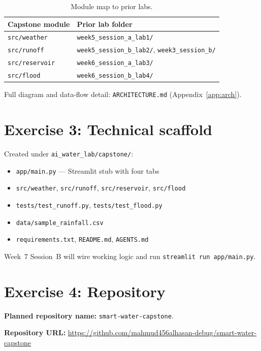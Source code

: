\documentclass[11pt,a4paper]{article}
\newcommand{\capstonerepo}{https://github.com/mahmud456alhasan-debug/smart-water-capstone}
\begin{document}
\begin{table}[htbp]
  \centering
  \caption{Module map to prior labs.}
  \label{tab:reuse}
  \small
  \begin{tabular}{@{}ll@{}}
    \toprule
    Capstone module & Prior lab folder \\
    \midrule
    \texttt{src/weather} & \texttt{week5\_session\_a\_lab1/} \\
    \texttt{src/runoff} & \texttt{week5\_session\_b\_lab2/}, \texttt{week3\_session\_b/} \\
    \texttt{src/reservoir} & \texttt{week6\_session\_a\_lab3/} \\
    \texttt{src/flood} & \texttt{week6\_session\_b\_lab4/} \\
    \bottomrule
  \end{tabular}
\end{table}

Full diagram and data-flow detail: \texttt{ARCHITECTURE.md} (Appendix~\ref{app:arch}).

\section{Exercise 3: Technical scaffold}

Created under \texttt{ai\_water\_lab/capstone/}:
\begin{itemize}[noitemsep]
  \item \texttt{app/main.py} --- Streamlit stub with four tabs
  \item \texttt{src/weather}, \texttt{src/runoff}, \texttt{src/reservoir}, \texttt{src/flood}
  \item \texttt{tests/test\_runoff.py}, \texttt{tests/test\_flood.py}
  \item \texttt{data/sample\_rainfall.csv}
  \item \texttt{requirements.txt}, \texttt{README.md}, \texttt{AGENTS.md}
\end{itemize}

Week~7 Session~B will wire working logic and run \texttt{streamlit run app/main.py}.

\section{Exercise 4: Repository}

\textbf{Planned repository name:} \texttt{smart-water-capstone}.

\textbf{Repository URL:} \url{\capstonerepo}
\end{document}
